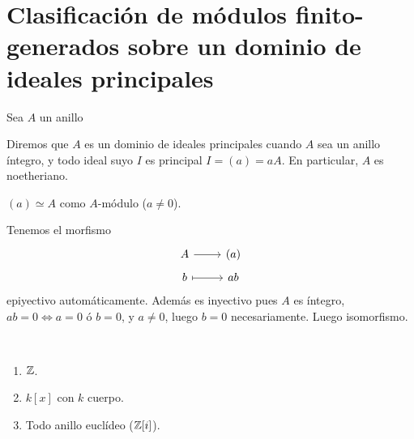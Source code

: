 \chapter{Clasificaci\'on de m\'odulos finito-generados sobre un dominio de ideales principales} 
\justifying

Sea $A$ un anillo
\begin{defi}
    Diremos que $A$ es un dominio de ideales principales cuando $A$ sea un anillo \'integro, y todo ideal suyo $I$ es principal $I = (a)=aA$. En particular, $A$ es noetheriano.
\end{defi}
\begin{prop}
    $(a)\simeq A$ como $A$-m\'odulo ($a\neq 0$). 
\end{prop}
\begin{dem}
    Tenemos el morfismo
    $$\bt A \rar & (a) \\[-5mm] b \rar[mapsto] & ab \et$$
    epiyectivo autom\'aticamente. Adem\'as es inyectivo pues $A$ es \'integro, $ab =0 \iff a = 0$ \'o $b=0$, y $a\neq 0$, luego $b=0$ necesariamente. Luego isomorfismo.
\end{dem}
\begin{ejems} \, \vspace{-3mm}
    \begin{enumerate}
        \item $\mathbb{Z}$. 
        \item $k[x]$ con $k$ cuerpo.
        \item Todo anillo eucl\'ideo ($\mathbb{Z}[i]$). 
    \end{enumerate}
\end{ejems}

